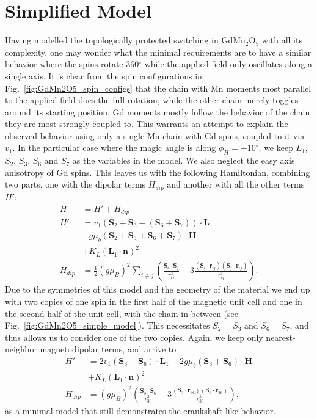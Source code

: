 \section{Simplified Model}
Having modelled the topologically protected switching in  GdMn$_2$O$_5$ with all its complexity, one may wonder what the minimal requirements are to have a similar behavior where the spins rotate 360$^\circ$ while the applied field only oscillates along a single axis.
It is clear from the spin configurations in Fig.~\ref{fig:GdMn2O5_spin_configs} that the chain with Mn moments most parallel to the applied field does the full rotation, while the other chain merely toggles around its starting position. Gd moments mostly follow the behavior of the chain they are most strongly coupled to. This warrants an attempt to explain the observed behavior using only a single Mn chain with Gd spins, coupled to it via $v_1$. 
In the particular case where the magic angle is along $\phi_H = +10^\circ$, we keep $L_1$, $S_2$, $S_3$, $
S_6$ and $S_7$ as the variables in the model. We also neglect the easy axis anisotropy of Gd spins.
This leaves us with the following Hamiltonian, combining two parts, one with the dipolar terms $H_{dip}$ and another with all the other terms $H'$:
\begin{align}
	H &= H' + H_{dip} \\
	H' &= v_1(\mathbf{S}_2 + \mathbf{S}_3 - (\mathbf{S}_6 + \mathbf{S}_7))\cdot\mathbf{L}_1 \nonumber\\
	&- g \mu_b (\mathbf{S}_2 + \mathbf{S}_3 + \mathbf{S}_6 + \mathbf{S}_7) \cdot \mathbf{H} \nonumber\\
	&+ K_L (\mathbf{L}_1 \cdot \mathbf{n})^2 \nonumber\\
	H_{dip} &= \frac{1}{2}(g \mu_B)^2\sum_{i\neq j}\left(\frac{\mathbf{S}_i\cdot \mathbf{S}_j}{r_{ij}^
3}-3\frac{(\mathbf{S}_i\cdot \mathbf{r}_{ij})(\mathbf{S}_j\cdot \mathbf{r}_{ij})}{r_{ij}^5}\right)\nonumber.
\end{align}
Due to the symmetries of this model and the geometry of the material we end up with two copies of one spin in the first half of the magnetic unit cell and one in the second half of the unit cell, with the chain in between (see Fig.~\ref{fig:GdMn2O5_simple_model}).
This necessitates $S_2 = S_3$ and $S_6 = S_7$, and thus allows us to consider one of the two copies. Again, we keep only nearest-neighbor magnetodipolar terms, and arrive to
\begin{align}
	H' &= 2v_1(\mathbf{S}_3 - \mathbf{S}_6)\cdot\mathbf{L}_1 - 2g \mu_b (\mathbf{S}_3 + \mathbf{S}_6) 
\cdot \mathbf{H} \\
	&+ K_L (\mathbf{L}_1 \cdot \mathbf{n})^2 \nonumber\\
	H_{dip} &= (g \mu_B)^2\left(\frac{\mathbf{S}_3\cdot \mathbf{S}_6}{r_{36}^3}-3\frac{(\mathbf{S}_3\cdot \mathbf{r}_{36})(\mathbf{S}_6\cdot \mathbf{r}_{36})}{r_{36}^5}\right)\nonumber,
\end{align}
as a minimal model that still demonstrates the crankshaft-like behavior.

